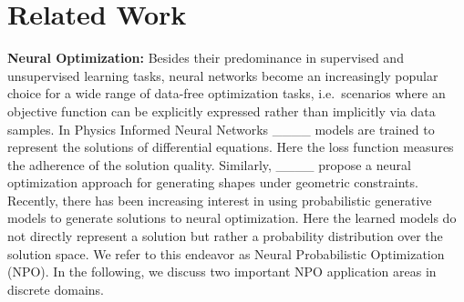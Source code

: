 \section{Related Work}
\label{sec:rel}
\textbf{Neural Optimization:} %
Besides their predominance in supervised and unsupervised learning tasks, neural networks become an increasingly popular choice for a wide range of data-free optimization tasks, i.e.~scenarios where an objective function can be explicitly expressed rather than implicitly via data samples.
In Physics Informed Neural Networks ____ models are trained to represent the solutions of differential equations. Here the loss function measures the adherence of the solution quality.
Similarly, ____ propose a neural optimization approach for generating shapes under geometric constraints. %
Recently, there has been increasing interest in using probabilistic generative models to generate solutions to neural optimization. Here the learned models do not directly represent a solution but rather a probability distribution over the solution space. We refer to this endeavor as Neural Probabilistic Optimization (NPO). In the following, we discuss two important NPO application areas in discrete domains.




